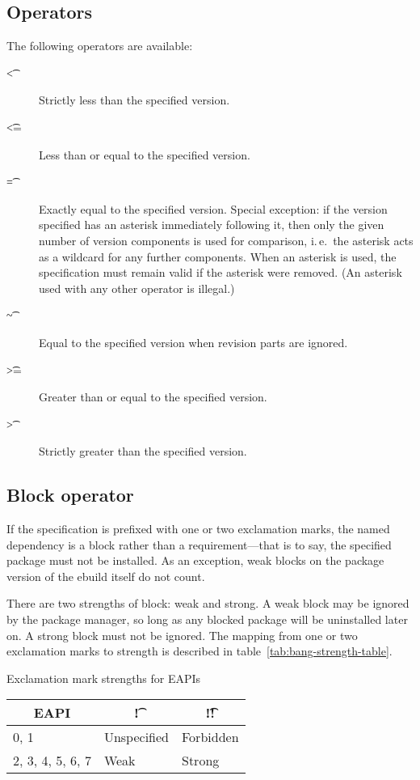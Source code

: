 \subsection{Operators}
\label{sec:dep-operator}

The following operators are available:

\begin{description}
\item[\t{<}] Strictly less than the specified version.
\item[\t{<=}] Less than or equal to the specified version.
\item[\t{=}] Exactly equal to the specified version. Special exception: if the version specified
    has an asterisk immediately following it, then only the given number of version components
    is used for comparison, i.\,e.\ the asterisk acts as a wildcard for any further components.
    When an asterisk is used, the specification must remain valid if the asterisk were removed.
    (An asterisk used with any other operator is illegal.)
\item[\t{\textasciitilde}] Equal to the specified version when revision parts are ignored.
\item[\t{>=}] Greater than or equal to the specified version.
\item[\t{>}] Strictly greater than the specified version.
\end{description}

\subsection{Block operator}

If the specification is prefixed with one or two exclamation marks, the named dependency is a block
rather than a requirement---that is to say, the specified package must not be installed. As an
exception, weak blocks on the package version of the ebuild itself do not count.

 There are two strengths of block: weak and strong. A weak block may be
ignored by the package manager, so long as any blocked package will be uninstalled later on. A
strong block must not be ignored. The mapping from one or two exclamation marks to strength is
described in table~\ref{tab:bang-strength-table}.

\begin{centertable}{Exclamation mark strengths for EAPIs}
    \label{tab:bang-strength-table}
    \begin{tabular}{lll}
      \toprule
      \multicolumn{1}{c}{\textbf{EAPI}} &
      \multicolumn{1}{c}{\textbf{\t{!}}} &
      \multicolumn{1}{c}{\textbf{\t{!!}}} \\
      \midrule
      0, 1              & Unspecified & Forbidden \\
      2, 3, 4, 5, 6, 7  & Weak        & Strong    \\
      \bottomrule
    \end{tabular}
\end{centertable}

